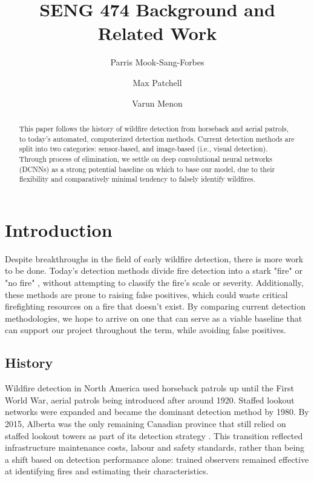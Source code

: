 \documentclass[sigconf]{acmart}
\begin{document}
\title{SENG 474 Background and Related Work}
\author{Parris Mook-Sang-Forbes}
\author{Max Patchell}
\author{Varun Menon}


\begin{abstract}
This paper follows the history of wildfire detection from horseback and aerial patrols, to today's automated, computerized detection methods. Current detection methods are split into two categories: sensor-based, and image-based (i.e., visual detection). Through process of elimination, we settle on deep convolutional neural networks (DCNNs) as a strong potential baseline on which to base our model, due to their flexibility and comparatively minimal tendency to falsely identify wildfires.
\end{abstract}
\maketitle

\vspace{-1em}
\section{Introduction}
Despite breakthroughs in the field of early wildfire detection, there is more work to be done. Today's detection methods divide fire detection into a stark "fire" or "no fire" \cite{el-madafri}, without attempting to classify the fire's scale or severity. Additionally, these methods are prone to raising false positives, which could waste critical firefighting resources on a fire that doesn't exist. By comparing current detection methodologies, we hope to arrive on one that can serve as a viable baseline that can support our project throughout the term, while avoiding false positives.

\subsection{History}
Wildfire detection in North America used horseback patrols up until the First World War, aerial patrols being introduced after around 1920. Staffed lookout networks were expanded and became the dominant detection method by 1980.  By 2015, Alberta was the only remaining Canadian province that still relied on staffed lookout towers as part of its detection strategy \cite{fpi}. This transition reflected infrastructure maintenance costs, labour and safety standards, rather than being a shift based on detection performance alone: trained observers remained effective at identifying fires and estimating their characteristics. 
\end{document}
